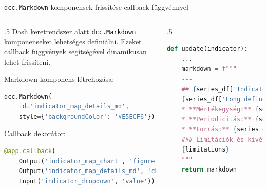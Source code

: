 \documentclass[english, aspectratio=169]{beamer}
\begin{document}

\begin{frame}[fragile]{\texttt{dcc.Markdown} komponensek frissítése callback függvénnyel}
	\begin{columns}
		\begin{column}{.5\textwidth}
			Dash keretrendszer alatt \texttt{dcc.Markdown} komponenseket lehetséges definiálni. Ezeket callback függvények segítségével dinamikusan lehet frissíteni.\par\smallskip
			Markdown komponens létrehozása:
			\begin{lstlisting}[language=python]
dcc.Markdown(
	id='indicator_map_details_md',
	style={'backgroundColor': '#E5ECF6'})				
			\end{lstlisting}
			Callback dekorátor:
			\begin{lstlisting}[language=python]
@app.callback(
	Output('indicator_map_chart', 'figure'),
	Output('indicator_map_details_md', 'children'),
	Input('indicator_dropdown', 'value'))
			\end{lstlisting}
		\end{column}
		\begin{column}{.5\textwidth}
			\begin{lstlisting}[language=python]
def update(indicator):
	...
	markdown = f"""
	---
	## {series_df['Indicator Name'].values[0]}
	{series_df['Long definition'].values[0]}
	* **Mértékegység:** {series_df['Unit of measure'].fillna('count').values[0]}
	* **Periodicitás:** {series_df['Periodicity'].fillna('N/A').values[0]}
	* **Forrás:** {series_df['Source'].values[0]}
	### Limitációk és kivételek: 
	{limitations}
	"""
	return markdown				
			\end{lstlisting}
		\end{column}
	\end{columns}
\end{frame}
\end{document}
